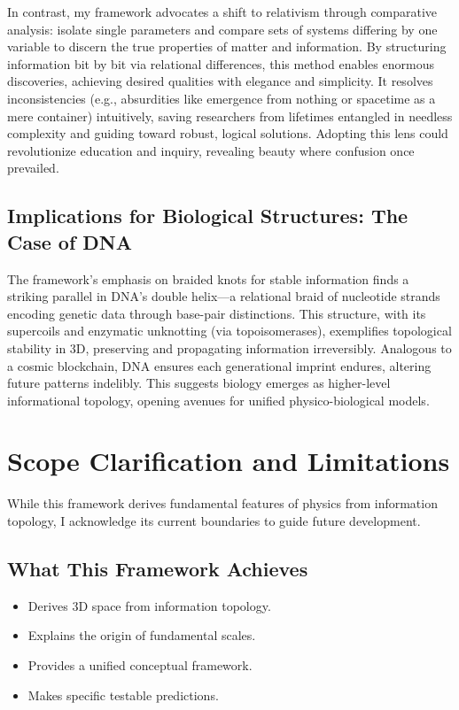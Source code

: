 \documentclass{article}
\begin{document}
In contrast, my framework advocates a shift to relativism through comparative analysis: isolate single parameters and compare sets of systems differing by one variable to discern the true properties of matter and information. By structuring information bit by bit via relational differences, this method enables enormous discoveries, achieving desired qualities with elegance and simplicity. It resolves inconsistencies (e.g., absurdities like emergence from nothing or spacetime as a mere container) intuitively, saving researchers from lifetimes entangled in needless complexity and guiding toward robust, logical solutions. Adopting this lens could revolutionize education and inquiry, revealing beauty where confusion once prevailed.

\subsection{Implications for Biological Structures: The Case of DNA}
The framework's emphasis on braided knots for stable information finds a striking parallel in DNA's double helix—a relational braid of nucleotide strands encoding genetic data through base-pair distinctions. This structure, with its supercoils and enzymatic unknotting (via topoisomerases), exemplifies topological stability in 3D, preserving and propagating information irreversibly. Analogous to a cosmic blockchain, DNA ensures each generational imprint endures, altering future patterns indelibly. This suggests biology emerges as higher-level informational topology, opening avenues for unified physico-biological models.

\section{Scope Clarification and Limitations}
While this framework derives fundamental features of physics from information topology, I acknowledge its current boundaries to guide future development.

\subsection{What This Framework Achieves}
\begin{itemize}
\item Derives 3D space from information topology.
\item Explains the origin of fundamental scales.
\item Provides a unified conceptual framework.
\item Makes specific testable predictions.
\end{itemize}
\end{document}
